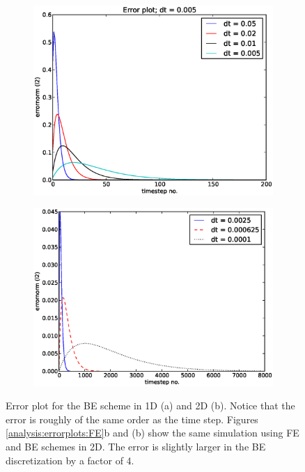 \begin{figure}[H]
\centering
 \begin{subfigure}{0.49\textwidth}
  \includegraphics[width=\textwidth]{../results/experiment_14052014_0744_errorplot_BE1D/results/errorplot.eps}
  \caption{}
 \end{subfigure}
 \begin{subfigure}{0.49\textwidth}
  \includegraphics[width=\textwidth]{../results/experiment_22052014_1317_BE2D_new_plots/results/errorplot.eps}
  \caption{}
 \end{subfigure}
 \caption[Error plots BE]{Error plot for the BE scheme in 1D (a) and 2D (b). Notice that the error is roughly of the same order as the time step. Figures \ref{analysis:errorplots:FE}b and (b) show the same simulation using FE and BE schemes in 2D. The error is slightly larger in the BE discretization by a factor of 4.}
 \label{analysis:errorplots:BE}
\end{figure}

